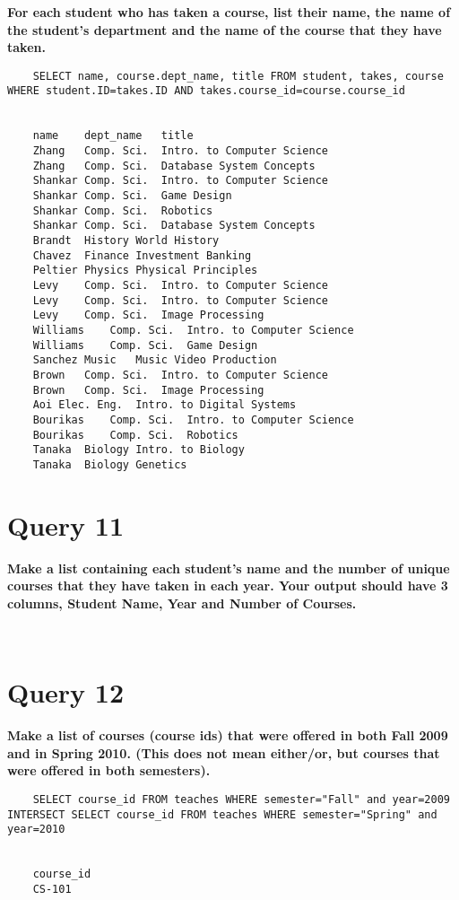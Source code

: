 \documentclass[letterpaper]{article}
\begin{document}
    \textbf{For each student who has taken a course, list their name, the name of the student's department and the name of the course that they have taken.}
    \begin{lstlisting}
    SELECT name, course.dept_name, title FROM student, takes, course WHERE student.ID=takes.ID AND takes.course_id=course.course_id
    
    
    name	dept_name	title	
    Zhang	Comp. Sci.	Intro. to Computer Science	
    Zhang	Comp. Sci.	Database System Concepts	
    Shankar	Comp. Sci.	Intro. to Computer Science	
    Shankar	Comp. Sci.	Game Design	
    Shankar	Comp. Sci.	Robotics	
    Shankar	Comp. Sci.	Database System Concepts	
    Brandt	History	World History	
    Chavez	Finance	Investment Banking	
    Peltier	Physics	Physical Principles	
    Levy	Comp. Sci.	Intro. to Computer Science	
    Levy	Comp. Sci.	Intro. to Computer Science	
    Levy	Comp. Sci.	Image Processing	
    Williams	Comp. Sci.	Intro. to Computer Science	
    Williams	Comp. Sci.	Game Design	
    Sanchez	Music	Music Video Production	
    Brown	Comp. Sci.	Intro. to Computer Science	
    Brown	Comp. Sci.	Image Processing	
    Aoi	Elec. Eng.	Intro. to Digital Systems	
    Bourikas	Comp. Sci.	Intro. to Computer Science	
    Bourikas	Comp. Sci.	Robotics	
    Tanaka	Biology	Intro. to Biology	
    Tanaka	Biology	Genetics       
    \end{lstlisting}
        
\section{Query 11}

    \textbf{Make a list containing each student's name and the number of unique courses that they have taken in each year.  Your output should have 3 columns, Student Name, Year and Number of Courses.}
    \begin{lstlisting}
        
    \end{lstlisting}
        
\section{Query 12}

    \textbf{Make a list of courses (course ids) that were offered in both Fall 2009 and in Spring 2010.   (This does not mean either/or, but courses that were offered in both semesters).}
    \begin{lstlisting}
    SELECT course_id FROM teaches WHERE semester="Fall" and year=2009 INTERSECT SELECT course_id FROM teaches WHERE semester="Spring" and year=2010
       
       
    course_id
    CS-101
    \end{lstlisting}
        
\end{document}
